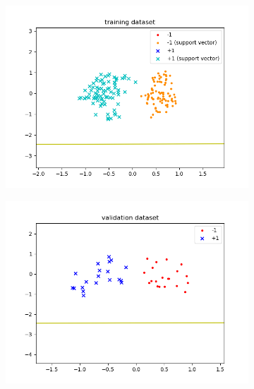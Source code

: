 \documentclass[a4paper]{article}
\begin{document}
\begin{enumerate}
\begin{enumerate}
\begin{figure}[H]
\begin{subfigure}[b]{.45\linewidth}
                \end{subfigure}
                \begin{subfigure}[b]{.45\linewidth}
                    \includegraphics[width=\linewidth]{../../img/4-1-3.png}
                \end{subfigure}
                \begin{subfigure}[b]{.45\linewidth}
                    \includegraphics[width=\linewidth]{../../img/4-1-4.png}
                \end{subfigure}
        \end{figure}


\end{enumerate}
\end{enumerate}
\end{document}
